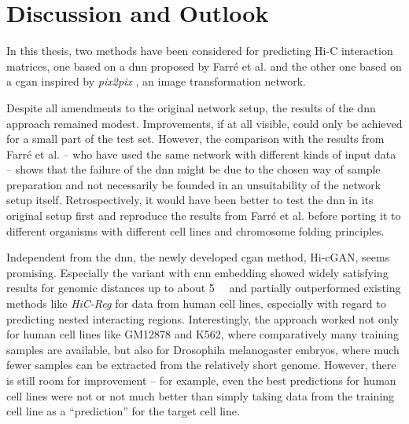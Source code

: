 \section{Discussion and Outlook}
In this thesis, two methods have been considered for predicting Hi-C interaction matrices,
one based on a \acrlong{dnn} proposed by Farr\'e et al. \cite{Farre2018a} and the other one based on a \acrlong{cgan}
inspired by \emph{pix2pix} \cite{Isola2017}, an image transformation network.

Despite all amendments to the original network setup,
the results of the \acrlong{dnn} approach remained modest.
Improvements, if at all visible, could only be achieved for a small part of the test set.
However, the comparison with the results from Farr\'e et al. \cite{Farre2018a} -- who have used the same network with different kinds of input data --
shows that the failure of the \acrshort{dnn} might be due to the chosen way of sample preparation 
and not necessarily be founded in an unsuitability of the network setup itself.
Retrospectively, it would have been better to test the \acrshort{dnn} in its original setup first and reproduce the results from Farr\'e et al. \cite{Farre2018a} 
before porting it to different organisms with different cell lines and chromosome folding principles.

Independent from the \acrshort{dnn}, the newly developed \acrlong{cgan} method, Hi-cGAN, seems promising.
Especially the variant with \acrshort{cnn} embedding showed widely satisfying results for genomic distances up to about \SI{5}{\mega\bp}
and partially outperformed existing methods like \emph{HiC-Reg} \cite{Zhang2019} for data from human cell lines, 
especially with regard to predicting nested interacting regions.
Interestingly, the approach worked not only for human cell lines like GM12878 and K562, where comparatively many training samples are available,
but also for Drosophila melanogaster embryos, where much fewer samples can be extracted from the relatively short genome.
However, there is still room for improvement -- for example, even the best predictions for human cell lines were not or not much better 
than simply taking data from the training cell line as a ``prediction'' for the target cell line.

